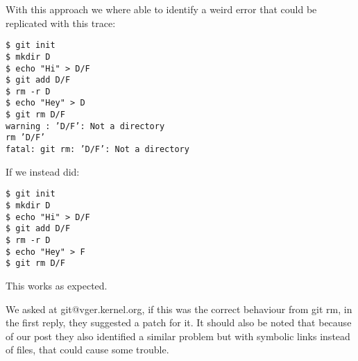 With this approach we where able to identify a weird error that could be replicated with this trace:
\begin{verbatim}
$ git init
$ mkdir D
$ echo "Hi" > D/F
$ git add D/F
$ rm -r D
$ echo "Hey" > D
$ git rm D/F
warning : ’D/F’: Not a directory
rm ’D/F’
fatal: git rm: ’D/F’: Not a directory
\end{verbatim}



If we instead did:

\begin{verbatim}
$ git init
$ mkdir D
$ echo "Hi" > D/F
$ git add D/F
$ rm -r D
$ echo "Hey" > F
$ git rm D/F
\end{verbatim}
This works as expected.


We asked at git@vger.kernel.org\cite{git_mail}, if this was the correct behaviour from git rm, in the first reply, they suggested a patch for it. It should also be noted that because of our post they also identified a similar problem but with symbolic links instead of files, that could cause some trouble.
